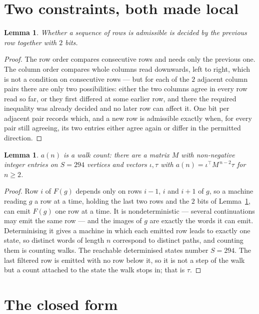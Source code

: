 \documentclass[11pt,a4paper]{article}
\theoremstyle{plain}
\newtheorem{lemma}[theorem]{Lemma}
\theoremstyle{definition}
\begin{document}
\section{Two constraints, both made local}

\begin{lemma}\label{lem:local}
Whether a sequence of rows is admissible is decided by the previous row together with
$2$ bits.
\end{lemma}

\begin{proof}
The row order compares consecutive rows and needs only the previous one. The column order
compares whole columns read downwards, left to right, which is not a condition on consecutive
rows --- but for each of the $2$ adjacent column pairs there are only two possibilities:
either the two columns agree in every row read so far, or they first differed at some earlier
row, and there the required inequality was already decided and no later row can affect it. One
bit per adjacent pair records which, and a new row is admissible exactly when, for every pair
still agreeing, its two entries either agree again or differ in the permitted direction.
\end{proof}

\begin{lemma}\label{lem:det}
$a(n)$ is a walk count: there are a matrix $M$ with non-negative integer entries on $S=294$
vertices and vectors $\iota,\tau$ with $a(n)=\iota^{\!\top}M^{\,n-2}\tau$ for $n\ge2$.
\end{lemma}

\begin{proof}
Row $i$ of $F(g)$ depends only on rows $i-1$, $i$ and $i+1$ of $g$, so a machine reading $g$ a
row at a time, holding the last two rows and the $2$ bits of Lemma~\ref{lem:local}, can
emit $F(g)$ one row at a time. It is nondeterministic --- several continuations may emit the
same row --- and the images of $g$ are exactly the words it can emit. Determinising it gives a
machine in which each emitted row leads to exactly one state, so distinct words of length $n$
correspond to distinct paths, and counting them is counting walks. The reachable determinised
states number $S=294$. The last filtered row is emitted with no row below it, so it is not a
step of the walk but a count attached to the state the walk stops in; that is $\tau$.
\end{proof}

\section{The closed form}
\end{document}
